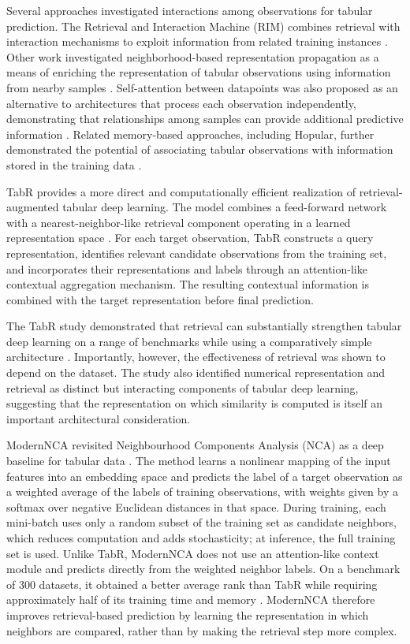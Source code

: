 \documentclass[11pt,a4paper,oneside, openany, reqno, chapter, nokorean]{oblivoir}
\theoremstyle{definition}
\theoremstyle{remark}
\numberwithin{equation}{chapter}
\theoremstyle{definition}
\theoremstyle{remark}
\theoremstyle{definition}
\begin{document}
Several approaches investigated interactions among observations for
tabular prediction. The Retrieval and Interaction Machine (RIM) combines
retrieval with interaction mechanisms to exploit information from related
training instances \cite{qin2021rim}. Other work investigated
neighborhood-based representation propagation as a means of enriching the
representation of tabular observations using information from nearby samples
\cite{du2022neighborhood}. Self-attention between datapoints was also
proposed as an alternative to architectures that process each observation
independently, demonstrating that relationships among samples can provide
additional predictive information \cite{kossen2021selfattention}. Related
memory-based approaches, including Hopular, further demonstrated the potential
of associating tabular observations with information stored in the training
data \cite{schafl2022hopular,ramsauer2021hopfield}.

TabR provides a more direct and computationally efficient realization of
retrieval-augmented tabular deep learning. The model combines a feed-forward
network with a nearest-neighbor-like retrieval component operating in a learned
representation space \cite{gorishniy2024tabr}. For each target observation,
TabR constructs a query representation, identifies relevant candidate
observations from the training set, and incorporates their representations and
labels through an attention-like contextual aggregation mechanism. The
resulting contextual information is combined with the target representation
before final prediction.

The TabR study demonstrated that retrieval can substantially strengthen tabular
deep learning on a range of benchmarks while using a comparatively simple
architecture \cite{gorishniy2024tabr}. Importantly, however, the effectiveness
of retrieval was shown to depend on the dataset. The study also identified
numerical representation and retrieval as distinct but interacting components
of tabular deep learning, suggesting that the representation on which
similarity is computed is itself an important architectural consideration.

ModernNCA revisited Neighbourhood Components Analysis (NCA) as a deep
baseline for tabular data \cite{ye2025modernnca}. The method learns a
nonlinear mapping of the input features into an embedding space and predicts
the label of a target observation as a weighted average of the labels of
training observations, with weights given by a softmax over negative Euclidean
distances in that space. During training, each mini-batch uses only a random
subset of the training set as candidate neighbors, which reduces computation
and adds stochasticity; at inference, the full training set is used. Unlike
TabR, ModernNCA does not use an attention-like context module and predicts
directly from the weighted neighbor labels. On a benchmark of 300 datasets, it
obtained a better average rank than TabR while requiring approximately half of
its training time and memory \cite{ye2025modernnca}. ModernNCA therefore
improves retrieval-based prediction by learning the representation in which
neighbors are compared, rather than by making the retrieval step more complex.
\end{document}
